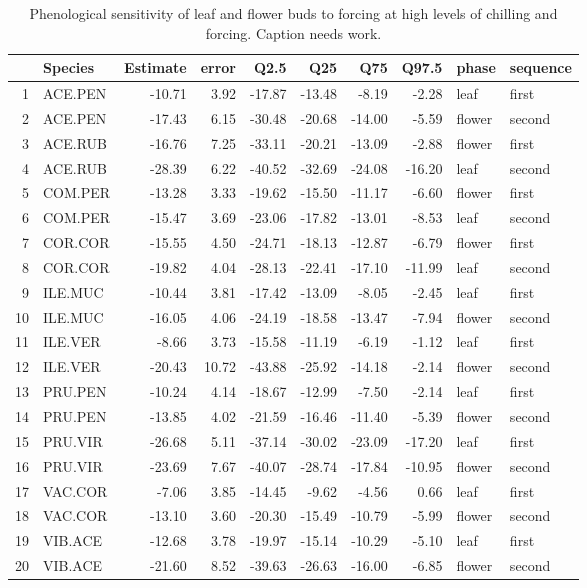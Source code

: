 \documentclass{article}\usepackage[]{graphicx}\usepackage[]{color}
\begin{document}
\begin{table}[ht]
\centering
\begin{tabular}{rlrrrrrrll}
  \hline
 & Species & Estimate & error & Q2.5 & Q25 & Q75 & Q97.5 & phase & sequence \\ 
  \hline
1 & ACE.PEN & -10.71 & 3.92 & -17.87 & -13.48 & -8.19 & -2.28 & leaf & first \\ 
  2 & ACE.PEN & -17.43 & 6.15 & -30.48 & -20.68 & -14.00 & -5.59 & flower & second \\ 
  3 & ACE.RUB & -16.76 & 7.25 & -33.11 & -20.21 & -13.09 & -2.88 & flower & first \\ 
  4 & ACE.RUB & -28.39 & 6.22 & -40.52 & -32.69 & -24.08 & -16.20 & leaf & second \\ 
  5 & COM.PER & -13.28 & 3.33 & -19.62 & -15.50 & -11.17 & -6.60 & flower & first \\ 
  6 & COM.PER & -15.47 & 3.69 & -23.06 & -17.82 & -13.01 & -8.53 & leaf & second \\ 
  7 & COR.COR & -15.55 & 4.50 & -24.71 & -18.13 & -12.87 & -6.79 & flower & first \\ 
  8 & COR.COR & -19.82 & 4.04 & -28.13 & -22.41 & -17.10 & -11.99 & leaf & second \\ 
  9 & ILE.MUC & -10.44 & 3.81 & -17.42 & -13.09 & -8.05 & -2.45 & leaf & first \\ 
  10 & ILE.MUC & -16.05 & 4.06 & -24.19 & -18.58 & -13.47 & -7.94 & flower & second \\ 
  11 & ILE.VER & -8.66 & 3.73 & -15.58 & -11.19 & -6.19 & -1.12 & leaf & first \\ 
  12 & ILE.VER & -20.43 & 10.72 & -43.88 & -25.92 & -14.18 & -2.14 & flower & second \\ 
  13 & PRU.PEN & -10.24 & 4.14 & -18.67 & -12.99 & -7.50 & -2.14 & leaf & first \\ 
  14 & PRU.PEN & -13.85 & 4.02 & -21.59 & -16.46 & -11.40 & -5.39 & flower & second \\ 
  15 & PRU.VIR & -26.68 & 5.11 & -37.14 & -30.02 & -23.09 & -17.20 & leaf & first \\ 
  16 & PRU.VIR & -23.69 & 7.67 & -40.07 & -28.74 & -17.84 & -10.95 & flower & second \\ 
  17 & VAC.COR & -7.06 & 3.85 & -14.45 & -9.62 & -4.56 & 0.66 & leaf & first \\ 
  18 & VAC.COR & -13.10 & 3.60 & -20.30 & -15.49 & -10.79 & -5.99 & flower & second \\ 
  19 & VIB.ACE & -12.68 & 3.78 & -19.97 & -15.14 & -10.29 & -5.10 & leaf & first \\ 
  20 & VIB.ACE & -21.60 & 8.52 & -39.63 & -26.63 & -16.00 & -6.85 & flower & second \\ 
   \hline
\end{tabular}
\caption{Phenological sensitivity of leaf and flower buds to forcing at high levels of chilling and forcing. Caption needs work.} 
\label{tab:phh}
\end{table}
\end{document}
